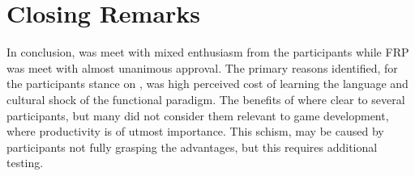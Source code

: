 \section{Closing Remarks}
In conclusion, \fs was meet with mixed enthusiasm from the participants while \gls{FRP} was meet with almost unanimous approval. The primary reasons identified, for the participants stance on \fs, was high perceived cost of learning the language and cultural shock of the functional paradigm. The benefits of \fs where clear to several participants, but many did not consider them relevant to game development, where productivity is of utmost importance. This schism, may be caused by participants not fully grasping the advantages, but this requires additional testing.
